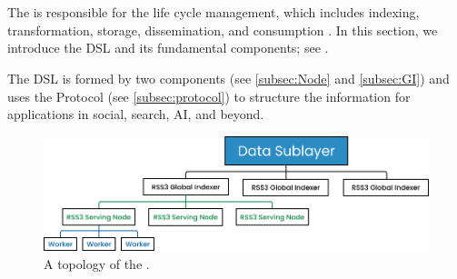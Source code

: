 \section{}
\label{sec:DSL}

The  is responsible for the  life cycle management, which includes indexing, transformation, storage, dissemination, and consumption \cite{nationalinstituteofstandardsandtechnology2016Information}.
In this section, we introduce the \gls{DSL} and its fundamental components; see .

The \gls{DSL} is formed by two components (see \cref{subsec:Node} and \cref{subsec:GI}) and uses the \gls{Protocol} (see \cref{subsec:protocol}) to structure the information for applications in social, search, AI, and beyond.

    {
        \begin{figure}[tb!]
            \centering
            \includegraphics[width=\columnwidth]{figures/DSL.png}
            \caption{A topology of the .}
            \label{fig:DSL}
        \end{figure}
    }




